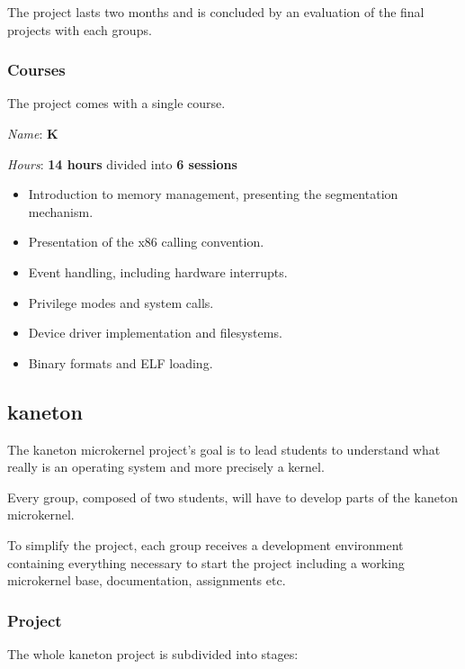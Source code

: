 \begin{multicols}{2}
The project lasts two months and is concluded by an evaluation of the
final projects with each groups.


\subsubsection{Courses}

The project comes with a single course.

\textit{Name}: \textbf{K}

\textit{Hours}: \textbf{14 hours} divided into \textbf{6 sessions}

\begin{itemize}
  \item
    Introduction to memory management, presenting the segmentation
    mechanism.
  \item
    Presentation of the x86 calling convention.
  \item
    Event handling, including hardware interrupts.
  \item
    Privilege modes and system calls.
  \item
    Device driver implementation and filesystems.
  \item
    Binary formats and ELF loading.
\end{itemize}

%
%

\subsection{kaneton}

The kaneton microkernel project's goal is to lead students to understand
what really is an operating system and more precisely a kernel.

Every group, composed of two students, will have to develop parts of
the kaneton microkernel.

To simplify the project, each group receives a development environment
containing everything necessary to start the project including a
working microkernel base, documentation, assignments etc.


\subsubsection{Project}

The whole kaneton project is subdivided into stages:


\end{multicols}
